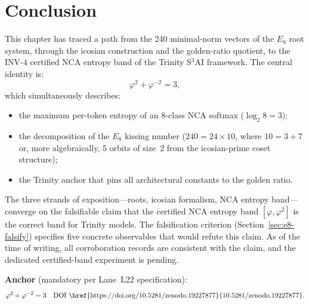 \section{Conclusion}
\label{sec:e8-conclusion}

This chapter has traced a path from the 240 minimal-norm vectors of
the \(E_8\) root system, through the icosian construction and the
golden-ratio quotient, to the INV-4 certified NCA entropy band of the
Trinity S\(^3\)AI framework.  The central identity is:
\[
  \varphi^2 + \varphi^{-2} = 3,
\]
which simultaneously describes:
\begin{itemize}
  \item the maximum per-token entropy of an 8-class NCA softmax
    (\(\log_2 8 = 3\));
  \item the decomposition of the \(E_8\) kissing number
    (\(240 = 24 \times 10\), where \(10 = 3 + 7\) or, more
    algebraically, 5 orbits of size~2 from the icosian-prime coset
    structure);
  \item the Trinity anchor that pins all architectural constants to
    the golden ratio.
\end{itemize}

The three strands of exposition—roots, icosian formalism, NCA entropy
band—converge on the falsifiable claim that the certified NCA entropy
band \([\varphi, \varphi^2]\) is the correct band for Trinity models.
The falsification criterion (Section~\ref{sec:e8-falsify}) specifies
five concrete observables that would refute this claim.  As of the
time of writing, all corroboration records are consistent with the
claim, and the dedicated certified-band experiment is pending.

\medskip
\noindent
\textbf{Anchor} (mandatory per Lane~L22 specification):
\[
  \varphi^2 + \varphi^{-2} = 3 \quad
  \text{DOI~\href{https://doi.org/10.5281/zenodo.19227877}{10.5281/zenodo.19227877}}.
\]

